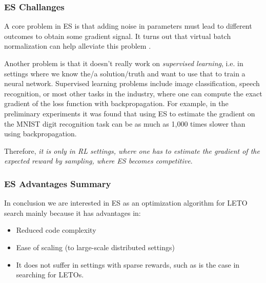 \subsubsection{ES Challanges}

A core problem in ES is that adding noise in parameters must lead to different outcomes to obtain some gradient signal. It turns out that virtual batch normalization can help alleviate this problem \cite{Karpathy}.

Another problem is that it doesn't really work on \emph{supervised learning}, i.e. in settings where we know the/a solution/truth and want to use that to train a neural network. Supervised learning problems include image classification, speech recognition, or most other tasks in the industry, where one can compute the exact gradient of the loss function with backpropagation. For example, in the preliminary experiments it was found that using ES to estimate the gradient on the MNIST digit recognition task can be as much as 1,000 times slower than using backpropagation\cite{Karpathy}.

Therefore, \emph{it is only in RL settings, where one has to estimate the gradient of the expected reward by sampling, where ES becomes competitive}.

\subsubsection{ES Advantages Summary}
In conclusion we are interested in ES as an optimization algorithm for LETO search mainly because it has advantages in:
\begin{itemize}
    \item Reduced code complexity
    \item Ease of scaling (to large-scale distributed settings)
    \item It does not suffer in settings with sparse rewards, such as is the case in searching for LETOs.
\end{itemize}

